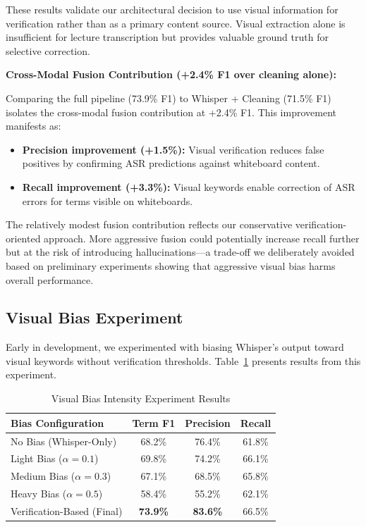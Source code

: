 These results validate our architectural decision to use visual information for verification rather than as a primary content source. Visual extraction alone is insufficient for lecture transcription but provides valuable ground truth for selective correction.

\textbf{Cross-Modal Fusion Contribution (+2.4\% F1 over cleaning alone):}

Comparing the full pipeline (73.9\% F1) to Whisper + Cleaning (71.5\% F1) isolates the cross-modal fusion contribution at +2.4\% F1. This improvement manifests as:

\begin{itemize}
    \item \textbf{Precision improvement (+1.5\%):} Visual verification reduces false positives by confirming ASR predictions against whiteboard content.
    \item \textbf{Recall improvement (+3.3\%):} Visual keywords enable correction of ASR errors for terms visible on whiteboards.
\end{itemize}

The relatively modest fusion contribution reflects our conservative verification-oriented approach. More aggressive fusion could potentially increase recall further but at the risk of introducing hallucinations---a trade-off we deliberately avoided based on preliminary experiments showing that aggressive visual bias harms overall performance.

\subsection{Visual Bias Experiment}

Early in development, we experimented with biasing Whisper's output toward visual keywords without verification thresholds. Table~\ref{tab:visual_bias} presents results from this experiment.

\begin{table}[h]
\centering
\caption{Visual Bias Intensity Experiment Results}
\label{tab:visual_bias}
\begin{tabular}{|l|c|c|c|}
\hline
\textbf{Bias Configuration} & \textbf{Term F1} & \textbf{Precision} & \textbf{Recall} \\
\hline
No Bias (Whisper-Only) & 68.2\% & 76.4\% & 61.8\% \\
\hline
Light Bias ($\alpha = 0.1$) & 69.8\% & 74.2\% & 66.1\% \\
\hline
Medium Bias ($\alpha = 0.3$) & 67.1\% & 68.5\% & 65.8\% \\
\hline
Heavy Bias ($\alpha = 0.5$) & 58.4\% & 55.2\% & 62.1\% \\
\hline
Verification-Based (Final) & \textbf{73.9\%} & \textbf{83.6\%} & 66.5\% \\
\hline
\end{tabular}
\end{table}

